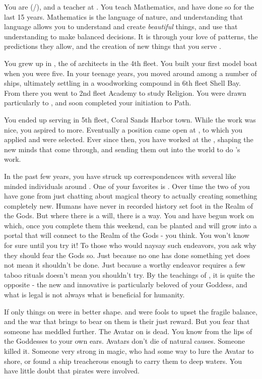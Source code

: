 \documentclass[char]{GL2020}
\begin{document}
\name{\cFlowPriest{}}

You are \cFlowPriest{\full} (\cFlowPriest{\they}/\cFlowPriest{\them}), and a teacher at \pSchool{}. You teach Mathematics, and have done so for the last 15 years. Mathematics is the language of nature, and understanding that language allows you to understand and create \emph{beautiful} things, and use that understanding to make balanced decisions. It is through your love of patterns, the predictions they allow, and the creation of new things that you serve \cFlow{\full}.

You grew up in \pShip{}, the \cFlowPriest{\child} of architects in the 4th fleet. You built your first model boat when you were five. In your teenage years, you moved around among a number of ships, ultimately settling in a woodworking compound in 6th fleet Shell Bay. From there you went to 2nd fleet Academy to study Religion. You were drawn particularly to \cFlow{}, and soon completed your initiation to \cFlow{\their} Path. 

You ended up serving in 5th fleet, Coral Sands Harbor town. While the work was nice, you aspired to more. Eventually a position came open at \pSchool{}, to which you applied and were selected. Ever since then, you have worked at the \pSc{}, shaping the new minds that come through, and sending them out into the world to do \cFlow{}’s work.

In the past few years, you have struck up correspondences with several like minded individuals around \pEarth{}. One of your favorites is \cCurse{}. Over time the two of you have gone from just chatting about magical theory to actually creating something completely new. Humans have never in recorded history set foot in the Realm of the Gods. But where there is a will, there is a way. You and \cCurse{} have begun work on \iMagicBeans{} which, once you complete them this weekend, can be planted and will grow into a portal that will connect \pEarth{} to the Realm of the Gods - you think. You won’t know for sure until you try it! To those who would naysay such endeavors, you ask why they should fear the Gods so. Just because no one has done something yet does not mean it shouldn’t be done. Just because a worthy endeavor requires a few taboo rituals doesn’t mean you shouldn’t try. By the teachings of \cFlow{}, it is quite the opposite - the new and innovative is particularly beloved of your Goddess, and what is legal is not always what is beneficial for humanity.

If only things on \pEarth{} were in better shape. \pFarm{} and \pTech{} were fools to upset the fragile balance, and the war that \cLoud{\full} brings to bear on them is their just reward. But you fear that someone has meddled further. The \cEbb{} Avatar on \pEarth{} is dead. You know from the lips of the Goddesses to your own ears. Avatars don’t die of natural causes. Someone killed it. Someone very strong in magic, who had some way to lure the Avatar to shore, or found a ship treacherous enough to carry them to deep waters. You have little doubt that pirates were involved.
\end{document}
